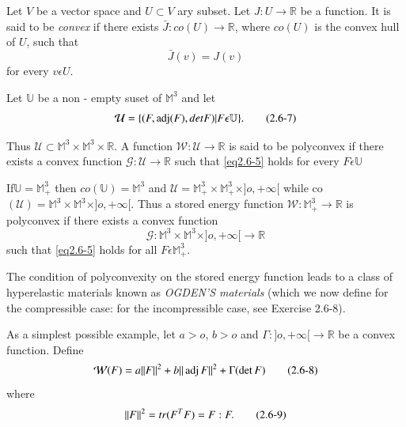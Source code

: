Let $V$ be a vector space and $U \subset V$ ary subset. Let $J : U
\rightarrow \mathbb{R}$ be a function. It is said to be {\em convex} if
there exists $\bar{J}: co(U) \rightarrow \mathbb{R}$, where $co(U)$ is
the convex hull of $U$, such that  
\begin{equation*}
\bar{J}(v) = J(v) \tag{2.6-6}\label{eq2.6-6}
\end{equation*}
for every $v \epsilon U$.

Let $\mathbb{U}$ be a non - empty suset of $\mathbb{M}^3$ and let
\begin{equation*}
\mathcal{U} = \{(F, \operatorname{adj}  (F), det F)
|F \epsilon \mathbb{U} \}. \tag{2.6-7}\label{eq2.6-7} 
\end{equation*}

Thus $\mathcal{U} \subset \mathbb{M}^3 \times \mathbb{M}^3 \times
\mathbb{R}$. A function $\mathcal{W}: \mathcal{U} \rightarrow
\mathbb{R}$ is said to be polyconvex if there exists a convex function
$\mathcal{G}: \mathcal{U} \rightarrow \mathbb{R}$ such
that \eqref{eq2.6-5} holds for every $F \epsilon \mathbb{U}$ 

If\pageoriginale $\mathbb{U}=\mathbb{M}^3_+$ then
$co(\mathbb{U})=\mathbb{M}^3$ and 
$\mathcal{U}=\mathbb{M}^3_+ \times \mathbb{M}^3_+ \times ] o, +\infty[$ while
    co $(\mathscr{U})= \mathbb{M}^3 \times \mathbb{M}^3 \times ]o,
  +\infty[$. Thus a stored energy function $
    \mathcal{W}:\mathbb{M}^3_+ \to \mathbb{R}$ is polyconvex if there
    exists a convex function 
$$
\mathcal{G}: \mathbb{M}^3 \times \mathbb{M}^3 \times] o, +\infty[\to \mathbb{R}
$$
such that \eqref{eq2.6-5} holds for all $F \epsilon \mathbb{M}^3_+$.

The condition of polyconvexity on the stored energy function leads to
a class of hyperelastic materials known as \textit{OGDEN'S materials}\break
(which we now define for the compressible case: for the incompressible
case, see Exercise 2.6-8). 

As a simplest possible example, let $a > o$, $b > o$ and $\Gamma: ]o,
  +\infty[ \to \mathbb{R}$ be a convex function. Define 
\begin{equation*}
\mathcal{W}(F)=a|| F||^2 +b|| \operatorname{adj}  F||^2 + \Gamma(\det
  F)\tag{2.6-8}\label{eq2.6-8} 
  \end{equation*}
where
\begin{equation*}
|| F ||^2= \\tr (F^T F)=F:F. \tag{2.6-9}\label{eq2.6-9}
\end{equation*}

